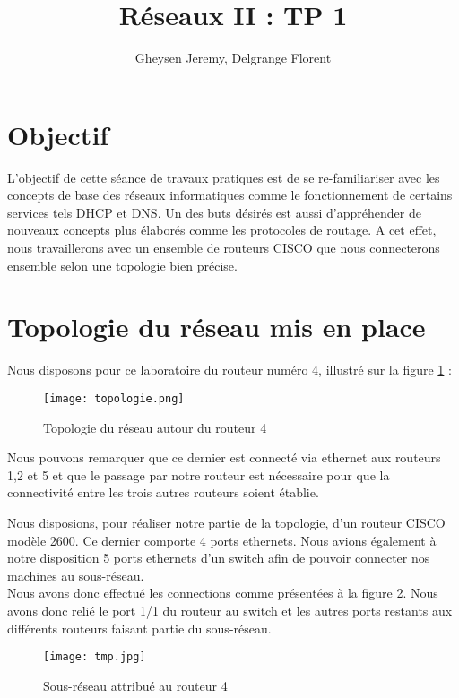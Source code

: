 \documentclass[10pt,a4paper]{article}
\author{Gheysen Jeremy, Delgrange Florent}
\title{Réseaux II : TP 1}
\begin{document}
\maketitle

\section{Objectif}

L'objectif de cette séance de travaux pratiques est de se re-familiariser avec les concepts de base des réseaux informatiques comme le fonctionnement de certains services tels DHCP et DNS. Un des buts désirés est aussi d'appréhender de nouveaux concepts plus élaborés comme les protocoles de routage. A cet effet, nous travaillerons avec un ensemble de routeurs CISCO que nous connecterons ensemble selon une topologie bien précise.  

\section{Topologie du réseau mis en place}

Nous disposons pour ce laboratoire du routeur numéro 4, illustré sur la figure \ref{topol} :

\begin{figure}[h]
\begin{center}
\texttt{[image: topologie.png]}
\caption{Topologie du réseau autour du routeur 4}
\label{topol}
\end{center}
\end{figure}

Nous pouvons remarquer que ce dernier est connecté via ethernet aux routeurs 1,2 et 5 et que le passage par notre routeur est nécessaire pour que la connectivité entre les trois autres routeurs soient établie.

Nous disposions, pour réaliser notre partie de la topologie, d'un routeur CISCO modèle 2600. Ce dernier comporte 4 ports ethernets. Nous avions également à notre disposition 5 ports ethernets d'un switch afin de pouvoir connecter nos machines au sous-réseau.\\
Nous avons donc effectué les connections comme présentées à la figure \ref{topoint}. Nous avons donc relié le port 1/1 du routeur au switch et les autres ports restants aux différents routeurs faisant partie du sous-réseau.  

\begin{figure}[h]
\begin{center}
\texttt{[image: tmp.jpg]}
\caption{Sous-réseau attribué au routeur 4}
\label{topoint}
\end{center}
\end{figure}
\end{document}
